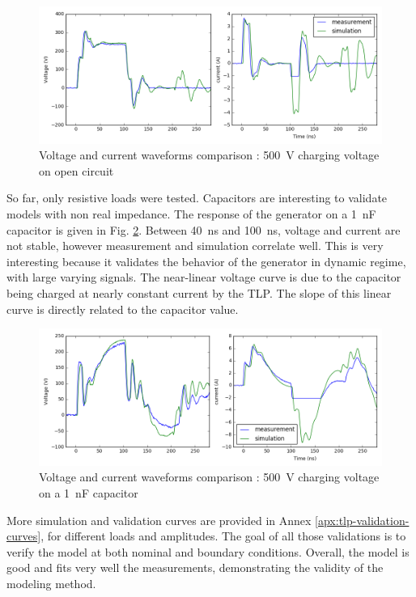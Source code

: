 \begin{figure}[!h]
  \centering
  \includegraphics[width=\textwidth]{src/2/figures/tlp_comparison_open_500V.png}
  \caption{Voltage and current waveforms comparison : \SI{500}{\volt} charging voltage on open circuit}
  \label{fig:comparison-tlp-open}
\end{figure}

So far, only resistive loads were tested.
Capacitors are interesting to validate models with non real impedance.
The response of the generator on a \SI{1}{\nano\farad} capacitor is given in Fig. \ref{fig:comparison-tlp-capa}.
Between \SI{40}{\nano\second} and \SI{100}{\nano\second}, voltage and current are not stable, however measurement and simulation correlate well.
This is very interesting because it validates the behavior of the generator in dynamic regime, with large varying signals.
The near-linear voltage curve is due to the capacitor being charged at nearly constant current by the TLP.
The slope of this linear curve is directly related to the capacitor value.

\begin{figure}[!h]
  \centering
  \includegraphics[width=\textwidth]{src/2/figures/tlp_comparison_1nF_500V.png}
  \caption{Voltage and current waveforms comparison : \SI{500}{\volt} charging voltage on a \SI{1}{\nano\farad} capacitor}
  \label{fig:comparison-tlp-capa}
\end{figure}

More simulation and validation curves are provided in Annex \ref{apx:tlp-validation-curves}, for different loads and amplitudes.
The goal of all those validations is to verify the model at both nominal and boundary conditions.
Overall, the model is good and fits very well the measurements, demonstrating the validity of the modeling method.

